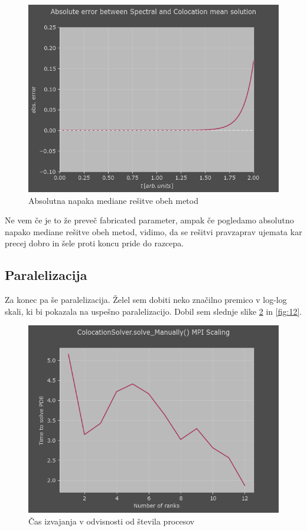 \documentclass[a4paper]{article}
\begin{document}
\begin{figure}[H]
    \centering
        \includegraphics[width=\linewidth]{./images/Abs_Error.png}
        \caption{Absolutna napaka mediane rešitve obeh metod}
\label{fig:10}  
\end{figure}

Ne vem če je to že preveč fabricated parameter, ampak če pogledamo absolutno napako mediane rešitve obeh metod, vidimo,
da se rešitvi pravzaprav ujemata kar precej dobro in šele proti koncu pride do razcepa. 

\subsection{Paralelizacija}
Za konec pa še paralelizacija. Želel sem dobiti neko značilno premico v log-log skali, ki bi pokazala na uspešno
paralelizacijo. Dobil sem slednje slike \ref{fig:11} in \ref{fig:12}.

\begin{figure}[H]
    \centering
        \includegraphics[width=\linewidth]{./images/C_Manual_MPI_scaling.png}
        \caption{Čas izvajanja v odvisnosti od števila procesov}
\label{fig:11}
\end{figure}
\end{document}

